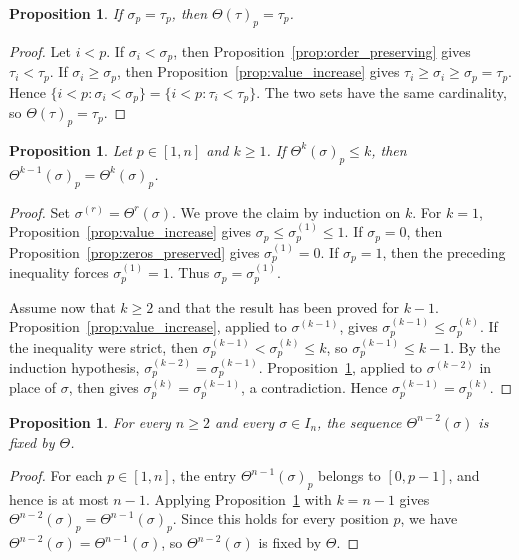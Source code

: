 \documentclass[11pt]{article}
\newtheorem{prop}[thm]{Proposition}
\theoremstyle{remark}
\theoremstyle{definition}
\begin{document}
\begin{prop}\label{prop:local_stability}
If $\sigma_p=\tau_p$, then $\Theta(\tau)_p=\tau_p$.
\end{prop}

\begin{proof}
Let $i<p$. If $\sigma_i<\sigma_p$, then Proposition~\ref{prop:order_preserving} gives $\tau_i<\tau_p$. If $\sigma_i\geq\sigma_p$, then Proposition~\ref{prop:value_increase} gives $\tau_i\geq\sigma_i\geq\sigma_p=\tau_p$. Hence $\{i<p:\sigma_i<\sigma_p\}=\{i<p:\tau_i<\tau_p\}$. The two sets have the same cardinality, so $\Theta(\tau)_p=\tau_p$.
\end{proof}

\begin{prop}\label{prop:stabilization_criterion}
Let $p\in[1,n]$ and $k\geq1$. If $\Theta^k(\sigma)_p\leq k$, then $\Theta^{k-1}(\sigma)_p=\Theta^k(\sigma)_p$.
\end{prop}

\begin{proof}
Set $\sigma^{(r)}=\Theta^r(\sigma)$. We prove the claim by induction on $k$. For $k=1$, Proposition~\ref{prop:value_increase} gives $\sigma_p\leq\sigma^{(1)}_p\leq1$. If $\sigma_p=0$, then Proposition~\ref{prop:zeros_preserved} gives $\sigma^{(1)}_p=0$. If $\sigma_p=1$, then the preceding inequality forces $\sigma^{(1)}_p=1$. Thus $\sigma_p=\sigma^{(1)}_p$.

Assume now that $k\geq2$ and that the result has been proved for $k-1$. Proposition~\ref{prop:value_increase}, applied to $\sigma^{(k-1)}$, gives $\sigma^{(k-1)}_p\leq\sigma^{(k)}_p$. If the inequality were strict, then $\sigma^{(k-1)}_p<\sigma^{(k)}_p\leq k$, so $\sigma^{(k-1)}_p\leq k-1$. By the induction hypothesis, $\sigma^{(k-2)}_p=\sigma^{(k-1)}_p$. Proposition~\ref{prop:local_stability}, applied to $\sigma^{(k-2)}$ in place of $\sigma$, then gives $\sigma^{(k)}_p=\sigma^{(k-1)}_p$, a contradiction. Hence $\sigma^{(k-1)}_p=\sigma^{(k)}_p$.
\end{proof}

\begin{prop}\label{prop:finite_stabilization}
For every $n\geq2$ and every $\sigma\in I_n$, the sequence $\Theta^{n-2}(\sigma)$ is fixed by $\Theta$.
\end{prop}

\begin{proof}
For each $p\in[1,n]$, the entry $\Theta^{n-1}(\sigma)_p$ belongs to $[0,p-1]$, and hence is at most $n-1$. Applying Proposition~\ref{prop:stabilization_criterion} with $k=n-1$ gives $\Theta^{n-2}(\sigma)_p=\Theta^{n-1}(\sigma)_p$. Since this holds for every position $p$, we have $\Theta^{n-2}(\sigma)=\Theta^{n-1}(\sigma)$, so $\Theta^{n-2}(\sigma)$ is fixed by $\Theta$.
\end{proof}
\end{document}
